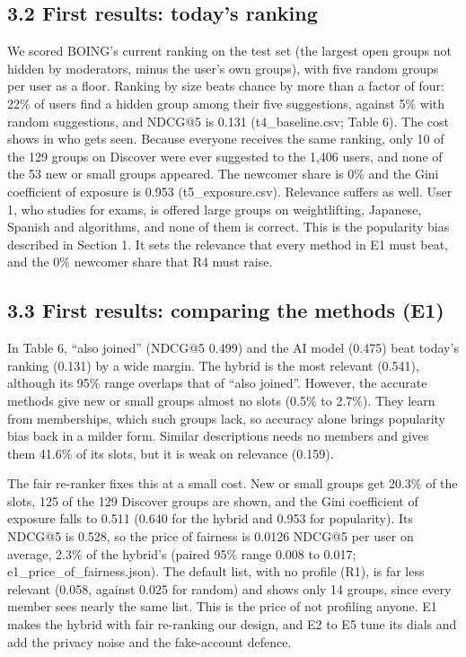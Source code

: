 \documentclass[11pt,letterpaper]{article}
\begin{document}
\subsection{3.2 First results: today's ranking}

We scored BOING's current ranking on the test set (the largest open groups not hidden by moderators, minus the
user's own groups), with five random groups per user as a floor. Ranking by size beats chance by more than a
factor of four: 22\% of users find a hidden group among their five suggestions, against 5\% with random
suggestions, and NDCG@5 is 0.131 (t4\_baseline.csv; Table 6). The cost shows in who gets seen. Because
everyone receives the same ranking, only 10 of the 129 groups on Discover were ever suggested to the 1,406
users, and none of the 53 new or small groups appeared. The newcomer share is 0\% and the Gini coefficient of
exposure is 0.953 (t5\_exposure.csv). Relevance suffers as well. User 1, who studies for exams, is offered
large groups on weightlifting, Japanese, Spanish and algorithms, and none of them is correct. This is the
popularity bias described in Section 1. It sets the relevance that every method in E1 must beat, and the 0\%
newcomer share that R4 must raise.

\subsection{3.3 First results: comparing the methods (E1)}

In Table 6, ``also joined'' (NDCG@5 0.499) and the AI model (0.475) beat today's ranking (0.131) by a wide
margin. The hybrid is the most relevant (0.541), although its 95\% range overlaps that of ``also joined''.
However, the accurate methods give new or small groups almost no slots (0.5\% to 2.7\%). They learn from
memberships, which such groups lack, so accuracy alone brings popularity bias back in a milder form. Similar
descriptions needs no members and gives them 41.6\% of its slots, but it is weak on relevance (0.159).

The fair re-ranker fixes this at a small cost. New or small groups get 20.3\% of the slots, 125 of the 129
Discover groups are shown, and the Gini coefficient of exposure falls to 0.511 (0.640 for the hybrid and 0.953
for popularity). Its NDCG@5 is 0.528, so the price of fairness is 0.0126 NDCG@5 per user on average, 2.3\% of
the hybrid's (paired 95\% range 0.008 to 0.017; e1\_price\_of\_fairness.json). The default list, with no
profile (R1), is far less relevant (0.058, against 0.025 for random) and shows only 14 groups, since every
member sees nearly the same list. This is the price of not profiling anyone. E1 makes the hybrid with fair
re-ranking our design, and E2 to E5 tune its dials and add the privacy noise and the fake-account defence.
\end{document}
